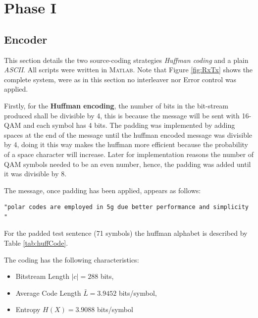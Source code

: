 \section{Phase I}

\subsection{Encoder}

\label{sec:encoder}

This section details the two source-coding strategies \emph{Huffman coding} and a plain \emph{ASCII}. All scripts were written in \textsc{Matlab}. Note that Figure \ref{fig:RxTx} shows the complete system, were as in this section no interleaver nor Error control was applied.

\label{ssec:huffman}

Firstly, for the \textbf{Huffman encoding}, the number of bits in the bit-stream produced shall be divisible by 4, this is because the message will be sent with 16-QAM and each symbol has 4 bits. The padding was implemented by adding spaces at the end of the message until the huffman encoded message was divisible by 4, doing it this way makes the huffman more efficient because the probability of a space character will increase. Later for implementation reasons the number of QAM symbols needed to be an even number, hence, the padding was added until it was divisible by 8. 

The message, once padding has been applied, appears as follows:

\begin{center}
	\begin{verbatim}
"polar codes are employed in 5g due better performance and simplicity     "
	\end{verbatim}
	
\end{center}

For the padded test sentence (71 symbols) the huffman alphabet is described by Table \ref{tab:huffCode}.

The coding has the following characteristics:

\begin{itemize}
  \item Bitstream Length $\lvert c\rvert = 288$ bits,
  \item Average Code Length $\bar L = 3.9452$ bits/symbol,
  \item Entropy $H(X)=3.9088$ bits/symbol
\end{itemize}



